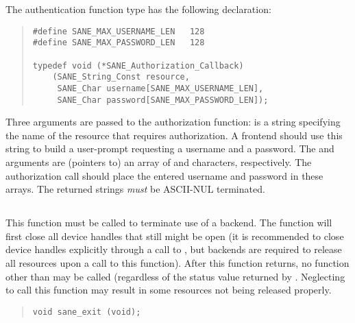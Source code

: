 \documentclass[11pt,DVIps]{report}
\begin{document}
The authentication function type has the following declaration:
\begin{quote}
\begin{verbatim}
#define SANE_MAX_USERNAME_LEN   128
#define SANE_MAX_PASSWORD_LEN   128

typedef void (*SANE_Authorization_Callback)
    (SANE_String_Const resource,
     SANE_Char username[SANE_MAX_USERNAME_LEN],
     SANE_Char password[SANE_MAX_PASSWORD_LEN]);
\end{verbatim}
\end{quote}
Three arguments are passed to the authorization function:
 is a string specifying the name of the resource that
requires authorization.  A frontend should use this string to build a
user-prompt requesting a username and a password.  The 
and  arguments are (pointers to) an array of
 and 
characters, respectively.  The authorization call should place the
entered username and password in these arrays.  The returned strings
{\em must\/} be ASCII-NUL terminated.

\subsection{}

This function must be called to terminate use of a backend.  The
function will first close all device handles that still might be open
(it is recommended to close device handles explicitly through a call
to , but backends are required to release all
resources upon a call to this function).  After this function returns,
no function other than  may be called (regardless
of the status value returned by .  Neglecting to
call this function may result in some resources not being released
properly.
\begin{quote}
\begin{verbatim}
void sane_exit (void);
\end{verbatim}
\end{quote}


\subsection{}
\end{document}
